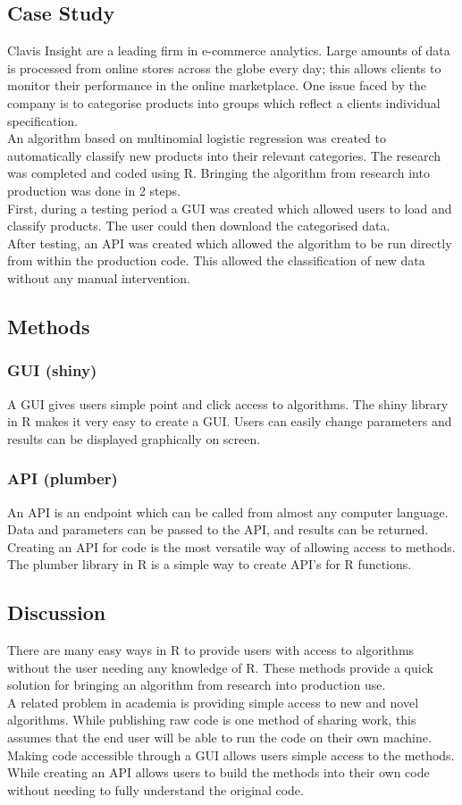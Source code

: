 \documentclass[12pt,a4paper]{article}
\begin{document}
\subsection*{Case Study}
Clavis Insight are a leading firm in e-commerce analytics. Large amounts of data is processed from online stores across the globe every day; this allows clients to monitor their performance in the online marketplace. One issue faced by the company is to categorise products into groups which reflect a clients individual specification.\\
An algorithm based on multinomial logistic regression was created to automatically classify new products into their relevant categories. The research was completed and coded using R. Bringing the algorithm from research into production was done in 2 steps.\\ 
First, during a testing period a GUI was created which allowed users to load and classify products. The user could then download the categorised data.\\
After testing, an API was created which allowed the algorithm to be run directly from within the production code. This allowed the classification of new data without any manual intervention. 

\subsection*{Methods}
\subsubsection*{GUI (shiny)}
A GUI gives users simple point and click access to algorithms. The shiny library in R makes it very easy to create a GUI. Users can easily change parameters and results can be displayed graphically on screen.
\subsubsection*{API (plumber)}
An API is an endpoint which can be called from almost any computer language. Data and parameters can be passed to the API, and results can be returned. Creating an API for code is the most versatile way of allowing access to methods. The plumber library in R is a simple way to create API's for R functions.


\subsection*{Discussion}
There are many easy ways in R to provide users with access to algorithms without the user needing any knowledge of R. These methods provide a quick solution for bringing an algorithm from research into production use.\\
A related problem in academia is providing simple access to new and novel algorithms. While publishing raw code is one method of sharing work, this assumes that the end user will be able to run the code on their own machine. Making code accessible through a GUI allows users simple access to the methods. While creating an API allows users to build the methods into their own code without needing to fully understand the original code.
\end{document}
